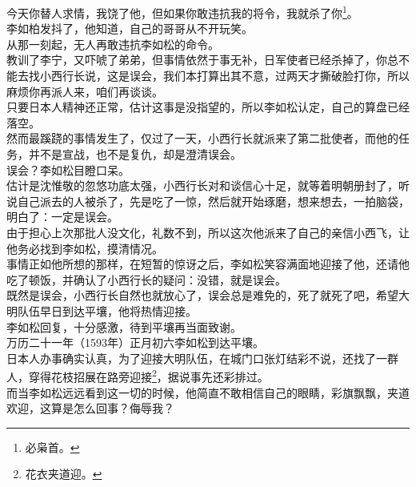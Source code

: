 \begin{multicols}{\theparacolNo}
今天你替人求情，我饶了他，但如果你敢违抗我的将令，我就杀了你\footnote{必枭首。}。\\

李如柏发抖了，他知道，自己的哥哥从不开玩笑。\\

从那一刻起，无人再敢违抗李如松的命令。\\

教训了李宁，又吓唬了弟弟，但事情依然于事无补，日军使者已经杀掉了，你总不能去找小西行长说，这是误会，我们本打算出其不意，过两天才撕破脸打你，所以麻烦你再派人来，咱们再谈谈。\\

只要日本人精神还正常，估计这事是没指望的，所以李如松认定，自己的算盘已经落空。\\

然而最蹊跷的事情发生了，仅过了一天，小西行长就派来了第二批使者，而他的任务，并不是宣战，也不是复仇，却是澄清误会。\\

误会？李如松目瞪口呆。\\

估计是沈惟敬的忽悠功底太强，小西行长对和谈信心十足，就等着明朝册封了，听说自己派去的人被杀了，先是吃了一惊，然后就开始琢磨，想来想去，一拍脑袋，明白了：一定是误会。\\

由于担心上次那批人没文化，礼数不到，所以这次他派来了自己的亲信小西飞，让他务必找到李如松，摸清情况。\\

事情正如他所想的那样，在短暂的惊讶之后，李如松笑容满面地迎接了他，还请他吃了顿饭，并确认了小西行长的疑问：没错，就是误会。\\

既然是误会，小西行长自然也就放心了，误会总是难免的，死了就死了吧，希望大明队伍早日到达平壤，他将热情迎接。\\

李如松回复，十分感激，待到平壤再当面致谢。\\

万历二十一年（1593年）正月初六李如松到达平壤。\\

日本人办事确实认真，为了迎接大明队伍，在城门口张灯结彩不说，还找了一群人，穿得花枝招展在路旁迎接\footnote{花衣夹道迎。}，据说事先还彩排过。\\

而当李如松远远看到这一切的时候，他简直不敢相信自己的眼睛，彩旗飘飘，夹道欢迎，这算是怎么回事？侮辱我？\\


\end{multicols}
